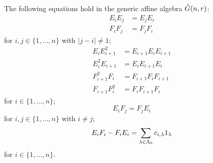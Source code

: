 \documentclass[a4paper, 11pt]{report}
\begin{document}
\begin{lemma}\label{lemma:generic-algebra-relations}
The following equations hold in the generic affine algebra $\hat{G}(n,r)$:
\begin{align*}
E_iE_j&=E_jE_i\\
F_iF_j&=F_jF_i
\end{align*}
for $i,j\in\{1,\ldots,n\}$ with $|j-i|\neq 1$;
\begin{align*}
E_iE_{i+1}^2 &= E_{i+1}E_iE_{i+1}\\
E_i^2E_{i+1} &= E_iE_{i+1}E_i\\
F_{i+1}^2F_i &= F_{i+1}F_iF_{i+1}\\
F_{i+1}F_i^2 &= F_iF_{i+1}F_i
\end{align*}
for $i\in\{1,\ldots,n\}$;
\begin{equation*}
E_iF_j=F_jE_i
\end{equation*}
for $i,j\in\{1,\ldots,n\}$ with $i\neq j$;
\begin{equation*}
E_iF_i-F_iE_i = \sum_{\lambda\in\Lambda_0{}} c_{i,\lambda}1_\lambda
\end{equation*}
for $i\in\{1,\ldots,n\}$.
\end{lemma}
\end{document}
